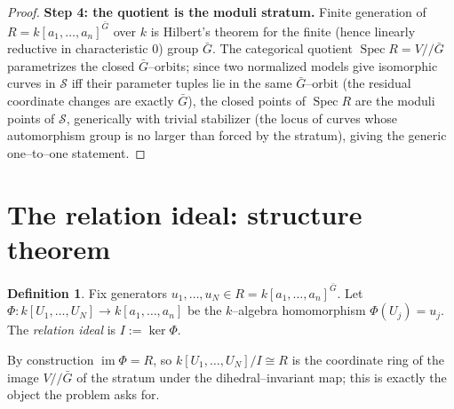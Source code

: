 \documentclass{amsart}
\theoremstyle{definition}
\newtheorem{definition}[theorem]{Definition}
\DeclareMathOperator{\Spec}{Spec}
\DeclareMathOperator{\im}{im}
\begin{document}
\begin{proof}
\textbf{Step 4: the quotient is the moduli stratum.}
Finite generation of $R=k[a_1,\dots,a_n]^{\bar G}$ over $k$ is Hilbert's theorem
for the finite (hence linearly reductive in characteristic $0$) group $\bar G$.
The categorical quotient $\Spec R=V/\!\!/\bar G$ parametrizes the closed
$\bar G$--orbits; since two normalized models give isomorphic curves in
$\mathcal S$ iff their parameter tuples lie in the same $\bar G$--orbit (the
residual coordinate changes are exactly $\bar G$), the closed points of $\Spec R$
are the moduli points of $\mathcal S$, generically with trivial stabilizer (the
locus of curves whose automorphism group is no larger than forced by the
stratum), giving the generic one--to--one statement.
\end{proof}

\section{The relation ideal: structure theorem}

\begin{definition}\label{def:I}
Fix generators $u_1,\dots,u_N\in R=k[a_1,\dots,a_n]^{\bar G}$. Let
$\Phi: k[U_1,\dots,U_N]\to k[a_1,\dots,a_n]$ be the $k$--algebra homomorphism
$\Phi(U_j)=u_j$. The \emph{relation ideal} is $I:=\ker\Phi$.
\end{definition}

By construction $\im\Phi=R$, so $k[U_1,\dots,U_N]/I\cong R$ is the coordinate ring
of the image $V/\!\!/\bar G$ of the stratum under the dihedral--invariant map; this
is exactly the object the problem asks for.
\end{document}

